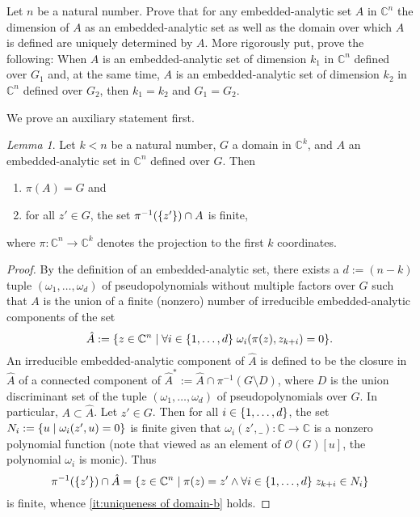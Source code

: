 \documentclass[a4paper]{amsart}
\newcommand{\C}{\mathbb{C}}
\renewcommand{\O}{\mathcal{O}}
\theoremstyle{remark}
\newtheorem{lemma}{Lemma}[question]
\numberwithin{equation}{question}
\DeclarePairedDelimiter\set{\{}{\}}
\begin{document}
\begin{question}[name=Exercise*, subtitle=Uniqueness of domain for embedded-analytic sets]
\label{qu:uniqueness of domain}
Let $n$ be a natural number. Prove that for any embedded-analytic set $A$ in $\C^n$ the dimension of $A$ as an embedded-analytic set as well as the domain over which $A$ is defined are uniquely determined by $A$. More rigorously put, prove the following: When $A$ is an embedded-analytic set of dimension $k_1$ in $\C^n$ defined over $G_1$ and, at the same time, $A$ is an embedded-analytic set of dimension $k_2$ in $\C^n$ defined over $G_2$, then $k_1 = k_2$ and $G_1 = G_2$.
\end{question}

\begin{solution}%
We prove an auxiliary statement first.
\begin{lemma}
\label{le:uniqueness of domain}
Let $k<n$ be a natural number, $G$ a domain in $\C^k$, and $A$ an embedded-analytic set in $\C^n$ defined over $G$. Then
\begin{enumerate}
\item\label{it:uniqueness of domain-a} $\pi(A) = G$ and
\item\label{it:uniqueness of domain-b} for all $z' \in G$, the set $\pi^{-1}(\set{z'}) \cap A$ is finite,
\end{enumerate}
where $\pi \colon \C^n \to \C^k$ denotes the projection to the first $k$ coordinates.
\end{lemma}

\begin{proof}
By the definition of an embedded-analytic set, there exists a $d := (n-k)$ tuple $(\omega_1,\dots,\omega_d)$ of pseudopolynomials without multiple factors over $G$ such that $A$ is the union of a finite (nonzero) number of irreducible embedded-analytic components of the set
\[
\hat A := \set{z \in \C^n \mid \forall i \in \set{1,\dots,d} \; \omega_i(\pi(z),z_{k+i}) = 0}.
\]
An irreducible embedded-analytic component of $\hat A$ is defined to be the closure in $\hat A$ of a connected component of $\hat A^* := \hat A \cap \pi^{-1}(G \setminus D)$, where $D$ is the union discriminant set of the tuple $(\omega_1,\dots,\omega_d)$ of pseudopolynomials over $G$. In particular, $A \subset \hat A$. Let $z' \in G$. Then for all $i \in \set{1,\dots,d}$, the set $N_i := \set{u \mid \omega_i(z',u) = 0}$ is finite given that $\omega_i(z',\_) \colon \C \to \C$ is a nonzero polynomial function (note that viewed as an element of $\O(G)[u]$, the polynomial $\omega_i$ is monic). Thus
\[
\pi^{-1}(\set{z'}) \cap \hat A = \set{z \in \C^n \mid \pi(z) = z' \land \forall i \in \set{1,\dots,d} \; z_{k+i} \in N_i}
\]
is finite, whence \cref{it:uniqueness of domain-b} holds.


\end{proof}
\end{solution}
\end{document}
